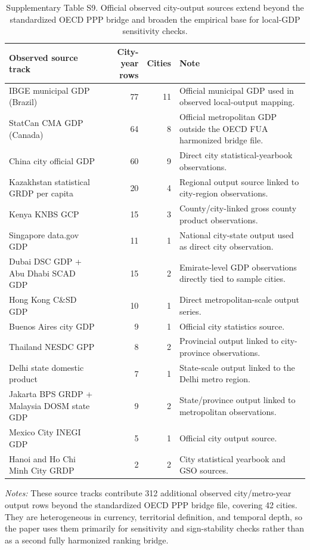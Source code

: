 \documentclass[oneside,pdflatex,sn-nature]{sn-jnl}
\begin{document}
\begin{table}[H]
\centering
\caption{Supplementary Table S9. Official observed city-output sources extend beyond the standardized OECD PPP bridge and broaden the empirical base for local-GDP sensitivity checks.}
\small
\setlength{\tabcolsep}{4pt}
\begin{tabular}{p{}rrp{}}
\toprule
Observed source track & City-year rows & Cities & Note \\
\midrule
IBGE municipal GDP (Brazil) & 77 & 11 & Official municipal GDP used in observed local-output mapping. \\
StatCan CMA GDP (Canada) & 64 & 8 & Official metropolitan GDP outside the OECD FUA harmonized bridge file. \\
China city official GDP & 60 & 9 & Direct city statistical-yearbook observations. \\
Kazakhstan statistical GRDP per capita & 20 & 4 & Regional output source linked to city-region observations. \\
Kenya KNBS GCP & 15 & 3 & County/city-linked gross county product observations. \\
Singapore data.gov GDP & 11 & 1 & National city-state output used as direct city observation. \\
Dubai DSC GDP + Abu Dhabi SCAD GDP & 15 & 2 & Emirate-level GDP observations directly tied to sample cities. \\
Hong Kong C\&SD GDP & 10 & 1 & Direct metropolitan-scale output series. \\
Buenos Aires city GDP & 9 & 1 & Official city statistics source. \\
Thailand NESDC GPP & 8 & 2 & Provincial output linked to city-province observations. \\
Delhi state domestic product & 7 & 1 & State-scale output linked to the Delhi metro region. \\
Jakarta BPS GRDP + Malaysia DOSM state GDP & 9 & 2 & State/province output linked to metropolitan observations. \\
Mexico City INEGI GDP & 5 & 1 & Official city output source. \\
Hanoi and Ho Chi Minh City GRDP & 2 & 2 & City statistical yearbook and GSO sources. \\
\bottomrule
\end{tabular}
\end{table}
\FloatBarrier

\noindent\textit{Notes:} These source tracks contribute 312 additional observed city/metro-year output rows beyond the standardized OECD PPP bridge file, covering 42 cities. They are heterogeneous in currency, territorial definition, and temporal depth, so the paper uses them primarily for sensitivity and sign-stability checks rather than as a second fully harmonized ranking bridge.
\end{document}
